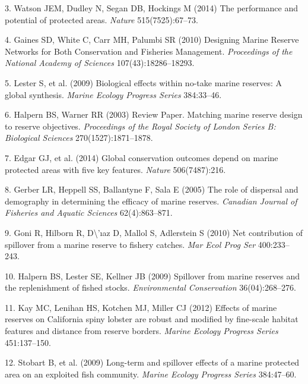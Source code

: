 \documentclass[9pt,twocolumn,twoside,lineno]{pnas-new}
\begin{document}
\leavevmode\hypertarget{ref-watson2014b}{}%
3. Watson JEM, Dudley N, Segan DB, Hockings M (2014) The performance and
potential of protected areas. \emph{Nature} 515(7525):67--73.

\leavevmode\hypertarget{ref-gaines2010}{}%
4. Gaines SD, White C, Carr MH, Palumbi SR (2010) Designing Marine
Reserve Networks for Both Conservation and Fisheries Management.
\emph{Proceedings of the National Academy of Sciences}
107(43):18286--18293.

\leavevmode\hypertarget{ref-lester2009}{}%
5. Lester S, et al. (2009) Biological effects within no-take marine
reserves: A global synthesis. \emph{Marine Ecology Progress Series}
384:33--46.

\leavevmode\hypertarget{ref-halpern2003}{}%
6. Halpern BS, Warner RR (2003) Review Paper. Matching marine reserve
design to reserve objectives. \emph{Proceedings of the Royal Society of
London Series B: Biological Sciences} 270(1527):1871--1878.

\leavevmode\hypertarget{ref-edgar2014}{}%
7. Edgar GJ, et al. (2014) Global conservation outcomes depend on marine
protected areas with five key features. \emph{Nature} 506(7487):216.

\leavevmode\hypertarget{ref-gerber2005}{}%
8. Gerber LR, Heppell SS, Ballantyne F, Sala E (2005) The role of
dispersal and demography in determining the efficacy of marine reserves.
\emph{Canadian Journal of Fisheries and Aquatic Sciences}
62(4):863--871.

\leavevmode\hypertarget{ref-goni2010}{}%
9. Goni R, Hilborn R, D\textbackslash{}'ıaz D, Mallol S, Adlerstein S
(2010) Net contribution of spillover from a marine reserve to fishery
catches. \emph{Mar Ecol Prog Ser} 400:233--243.

\leavevmode\hypertarget{ref-halpern2009}{}%
10. Halpern BS, Lester SE, Kellner JB (2009) Spillover from marine
reserves and the replenishment of fished stocks. \emph{Environmental
Conservation} 36(04):268--276.

\leavevmode\hypertarget{ref-kay2012}{}%
11. Kay MC, Lenihan HS, Kotchen MJ, Miller CJ (2012) Effects of marine
reserves on California spiny lobster are robust and modified by
fine-scale habitat features and distance from reserve borders.
\emph{Marine Ecology Progress Series} 451:137--150.

\leavevmode\hypertarget{ref-stobart2009}{}%
12. Stobart B, et al. (2009) Long-term and spillover effects of a marine
protected area on an exploited fish community. \emph{Marine Ecology
Progress Series} 384:47--60.
\end{document}

